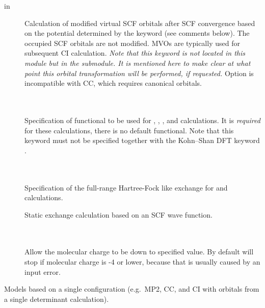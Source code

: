\begin{description}
\begin{description}
\item[ in ]
  Calculation of modified virtual SCF orbitals after SCF convergence based on the
  potential determined by the keyword (see comments below).
  The occupied SCF orbitals are not modified.
  MVOs are typically used for subsequent CI calculation.
  {\em Note that this keyword is not located in this module but in the
   submodule. It is mentioned here to make clear
  at what point this orbital transformation will be performed, if requested.}
  Option is incompatible with CC, which requires canonical orbitals.

\item[] \ \\
   \\
  Specification of functional to be used for , , ,
  and  calculations. It is \emph{required} for these calculations, there is no default functional.
  Note that this keyword must not be specified together with the Kohn--Shan DFT keyword .

\item[] \ \\
   \\
  Specification of the full-range Hartree-Fock like exchange for  and  calculations.

\item[]
  Static exchange calculation based on an SCF wave function.

\item[] \ \\
   \\
  Allow the molecular charge to be down to specified value. By default \dalton will stop if molecular charge is -4 or lower,
  because that is usually caused by an input error.

\end{description}

\item[{\color{blue} Single configuration based correlation models}] Models based on a single configuration (e.g.\ MP2, CC, and CI with orbitals from a single determinant calculation).

\begin{description}


\end{description}
\end{description}

